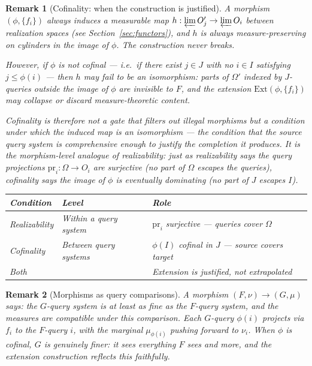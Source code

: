 \documentclass[11pt]{article}
\newtheorem{remark}{Remark}
\newcommand{\pr}{\mathrm{pr}}
\newcommand{\Ext}{\mathrm{Ext}}
\newcommand{\varlim}{\varprojlim}
\begin{document}
\begin{remark}[Cofinality: when the construction is justified]
A morphism $(\phi, \{f_i\})$ always induces a measurable map
$h : \varlim O'_j \to \varlim O_i$ between realization spaces (see
Section~\ref{sec:functors}), and $h$ is always measure-preserving on
cylinders in the image of $\phi$.  The construction never breaks.

However, if $\phi$ is not \emph{cofinal} --- i.e.\ if there exist $j \in J$
with no $i \in I$ satisfying $j \leq \phi(i)$ --- then $h$ may fail to be
an isomorphism: parts of $\Omega'$ indexed by $J$-queries outside the image
of $\phi$ are invisible to $F$, and the extension $\Ext(\phi, \{f_i\})$ may
collapse or discard measure-theoretic content.

Cofinality is therefore not a gate that filters out illegal morphisms but
a \emph{condition under which the induced map is an isomorphism} ---
the condition that the source query system is comprehensive enough to
justify the completion it produces.  It is the morphism-level analogue of
realizability: just as realizability says the query projections
$\pr_i : \Omega \to O_i$ are surjective (no part of $\Omega$ escapes the
queries), cofinality says the image of $\phi$ is eventually dominating
(no part of $J$ escapes $I$).

\begin{center}
\renewcommand{\arraystretch}{1.3}
\begin{tabular}{lll}
\hline
\textbf{Condition} & \textbf{Level} & \textbf{Role} \\
\hline
Realizability & Within a query system
  & $\pr_i$ surjective --- queries cover $\Omega$ \\
Cofinality & Between query systems
  & $\phi(I)$ cofinal in $J$ --- source covers target \\
Both & & Extension is justified, not extrapolated \\
\hline
\end{tabular}
\end{center}
\end{remark}

\begin{remark}[Morphisms as query comparisons]
A morphism $(F, \nu) \to (G, \mu)$ says: the $G$-query system is at least as
fine as the $F$-query system, and the measures are compatible under this
comparison.  Each $G$-query $\phi(i)$ projects via $f_i$ to the $F$-query
$i$, with the marginal $\mu_{\phi(i)}$ pushing forward to $\nu_i$.  When
$\phi$ is cofinal, $G$ is genuinely finer: it sees everything $F$ sees and
more, and the extension construction reflects this faithfully.
\end{remark}
\end{document}
